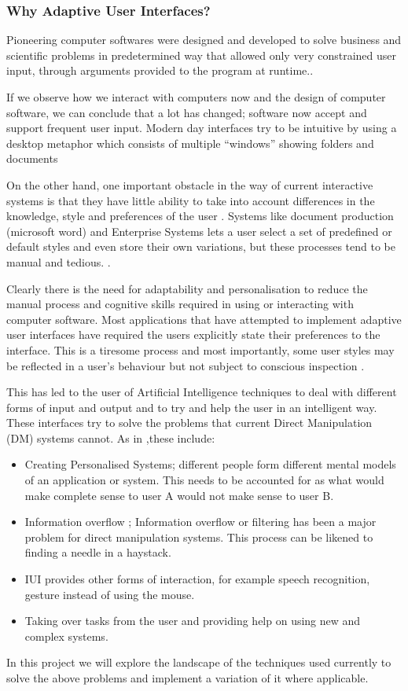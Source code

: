 \subsubsection{Why Adaptive User Interfaces?}
Pioneering computer softwares were designed and developed to solve business and scientific problems in predetermined way that allowed only very constrained user input, through arguments provided to the program at runtime.\cite{langley1997machine}.

If we observe how we interact with computers now and the design of computer software, we can conclude that a lot has changed; software now accept and support frequent user input. Modern day interfaces try to be intuitive by using a desktop metaphor which consists of multiple ``windows'' showing folders and documents \cite{patrick2003intelligent}

On the other hand, one important obstacle in the way of current interactive systems is that they have little ability to take into account differences in the knowledge, style and preferences of the user \cite{langley1997machine}.
Systems like document production (microsoft word) and Enterprise Systems lets a user select a set of predefined or default styles and even store their own variations, but these processes tend to be manual and tedious. \cite{langley1997machine}.

Clearly there is the need for adaptability and personalisation to reduce the manual process and cognitive skills required in using or interacting with computer software. Most applications that have attempted to implement adaptive user interfaces have required the users explicitly state their preferences to the interface. This is a tiresome process and most importantly, some user styles may be reflected in a user's behaviour but not subject to conscious inspection \cite{langley1997machine}.

This has led to the user of Artificial Intelligence techniques to deal with different forms of input and output and to try and help the user in an intelligent way. These interfaces try to solve the problems that current Direct Manipulation (DM) systems cannot. As in \cite{patrick2003intelligent},these include:
\begin{itemize}
\item Creating Personalised Systems; different people form different mental models of an application or system. This needs to be accounted for as what would make complete sense to user A would not make sense to user B.
\item Information overflow ; Information overflow or filtering has been a major problem for direct manipulation systems. This process can be likened to finding a needle in a haystack.
\item IUI provides other forms of interaction, for example speech recognition, gesture instead of using the mouse.
\item Taking over tasks from the user and providing help on using new and complex systems.
\end{itemize}
In this project we will explore the landscape of the techniques used currently to solve the above problems and implement a variation of it where applicable.
